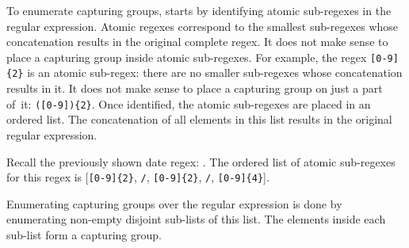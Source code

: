 To enumerate capturing groups, \Forest starts by identifying atomic sub-regexes in the regular expression.
Atomic regexes correspond to the smallest sub-regexes whose concatenation results in the original complete regex.
It does not make sense to place a capturing group inside atomic sub-regexes. For example, the regex \verb![0-9]{2}! is an atomic sub-regex: there are no smaller sub-regexes whose concatenation results in it. It does not make sense to place a capturing group on just a part of~it: \verb!([0-9]){2}!.
Once identified, the atomic sub-regexes are placed in an ordered list. The concatenation of all elements in this list results in the original regular expression.

\begin{example}
Recall the previously shown date regex: . The ordered list of atomic sub-regexes for this regex is [\verb![0-9]{2}!, \verb!/!, \verb![0-9]{2}!, \verb!/!, \verb![0-9]{4}!].
\end{example}

Enumerating capturing groups over the regular expression is done by enumerating non-empty disjoint sub-lists of this list. The elements inside each sub-list form a capturing group.

